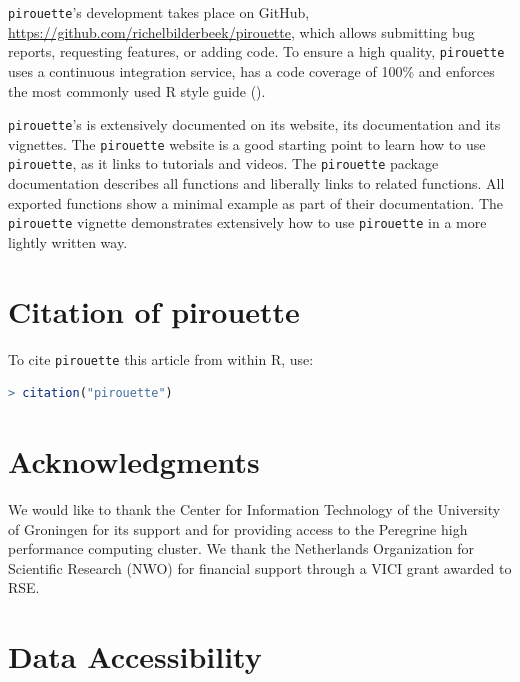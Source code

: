 \verb;pirouette;'s development takes place on GitHub,
\url{https://github.com/richelbilderbeek/pirouette},
which allows submitting bug reports, requesting features, 
or adding code. To ensure a high quality, \verb;pirouette; 
uses a continuous integration service, has a code coverage of 100\%
and enforces the most commonly used R style guide (\cite{style_guide}).

\verb;pirouette;'s is extensively documented on its website,
its documentation and its vignettes.
The \verb;pirouette; website is a good starting point to learn
how to use \verb;pirouette;, as it links to tutorials and videos.
The \verb;pirouette; package documentation describes
all functions and liberally links to related functions.
All exported functions show a minimal example as part of their documentation.
The \verb;pirouette; vignette demonstrates extensively how 
to use \verb;pirouette; in a more lightly written way. 

\section{Citation of pirouette}

To cite \verb;pirouette; this article from within R, use:

\begin{lstlisting}[language=R]
> citation("pirouette")
\end{lstlisting}

\section{Acknowledgments}

We would like to thank the Center for Information Technology of the University 
of Groningen for its support and for providing access to the Peregrine 
high performance computing cluster. 
We thank the Netherlands 
Organization for Scientific Research (NWO) for financial support 
through a VICI grant awarded to RSE.

\section{Data Accessibility}

